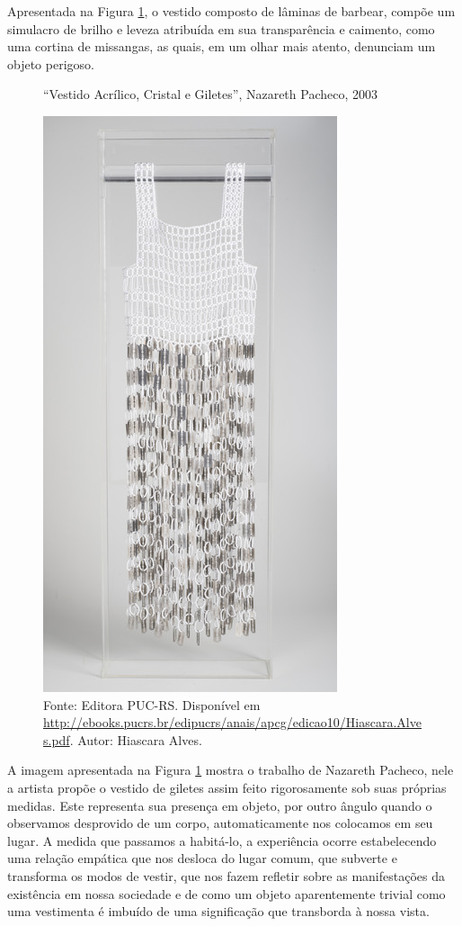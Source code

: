 \begin{refsection}
    Apresentada na Figura \ref{fig:vestido-acrilico}, o vestido composto de lâminas de barbear, compõe um simulacro de brilho e leveza atribuída em sua transparência e caimento, como uma cortina de missangas, as quais, em um olhar mais atento, denunciam um objeto perigoso.

    \begin{figure}[ht]%
        \centering%
        \caption{``Vestido Acrílico, Cristal e Giletes'', Nazareth Pacheco, 2003}%
        \includegraphics[width=.5\textwidth]{articles/13-dispositivo-moda-a-r/image1.jpg}%
        \caption*{Fonte: Editora PUC-RS. Disponível em \url{http://ebooks.pucrs.br/edipucrs/anais/apcg/edicao10/Hiascara.Alves.pdf}. Autor: Hiascara Alves.}%
        \label{fig:vestido-acrilico}%
    \end{figure}%

    A imagem apresentada na Figura \ref{fig:vestido-acrilico} mostra o trabalho de Nazareth Pacheco, nele a artista propõe o vestido de giletes assim feito rigorosamente sob suas próprias medidas. Este representa sua presença em objeto, por outro ângulo quando o observamos desprovido de um corpo, automaticamente nos colocamos em seu lugar. A medida que passamos a habitá-lo, a experiência ocorre estabelecendo uma relação empática que nos desloca do lugar comum, que subverte e transforma os modos de vestir, que nos fazem refletir sobre as manifestações da existência em nossa sociedade e de como um objeto aparentemente trivial como uma vestimenta é imbuído de uma significação que transborda à nossa vista.


\end{refsection}
